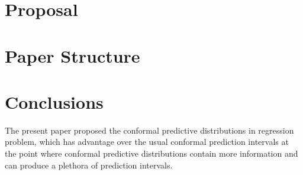 \documentclass[10pt,a4paper]{article}
\begin{document}
\section{Proposal}

\section{Paper Structure}

\section{Conclusions}
The present paper proposed the conformal predictive distributions in regression problem, which has advantage over the usual conformal prediction intervals at the point where conformal predictive distributions contain more information and can produce a plethora of prediction intervals.

\medskip
 
\printbibliography
\end{document}
